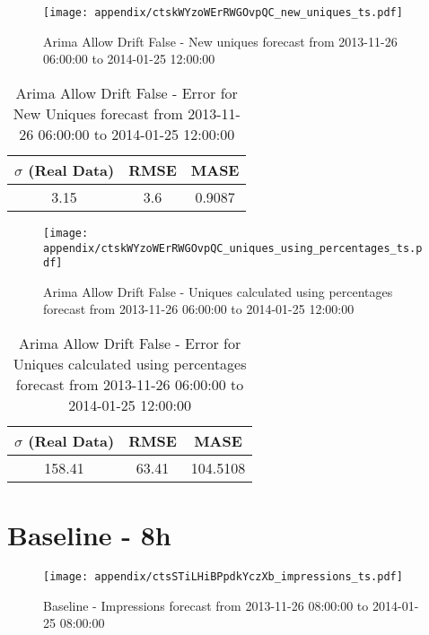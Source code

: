 \begin{figure}[H] \begin{center} \leavevmode
\texttt{[image: appendix/ctskWYzoWErRWGOvpQC\_new\_uniques\_ts.pdf]} \caption{
Arima Allow Drift False - New uniques forecast from 2013-11-26 06:00:00 to 2014-01-25 12:00:00} \label{fig:appendix/ctskWYzoWErRWGOvpQC_new_uniques_ts.pdf} \end{center}
\end{figure}

\begin{table}[H]
\centering
\footnotesize
\begin{tabular}{ccc}
$\sigma$ (Real Data) & RMSE & MASE   \\ \hline
3.15 & 3.6 & 0.9087 \\
\end{tabular}

\vspace{0.5cm}

\caption{
Arima Allow Drift False - Error for New Uniques forecast from 2013-11-26 06:00:00 to 2014-01-25 12:00:00}
\end{table}

\begin{figure}[H] \begin{center} \leavevmode
\texttt{[image: appendix/ctskWYzoWErRWGOvpQC\_uniques\_using\_percentages\_ts.pdf]} \caption{
Arima Allow Drift False - Uniques calculated using percentages forecast from 2013-11-26 06:00:00 to 2014-01-25 12:00:00} \label{fig:appendix/ctskWYzoWErRWGOvpQC_uniques_using_percentages_ts.pdf} \end{center}
\end{figure}

\begin{table}[H]
\centering
\footnotesize
\begin{tabular}{ccc}
$\sigma$ (Real Data) & RMSE & MASE   \\ \hline
158.41 & 63.41 & 104.5108 \\
\end{tabular}

\vspace{0.5cm}

\caption{
Arima Allow Drift False - Error for Uniques calculated using percentages forecast from 2013-11-26 06:00:00 to 2014-01-25 12:00:00}
\end{table}

\section{Baseline - 8h}
\begin{figure}[H] \begin{center} \leavevmode
\texttt{[image: appendix/ctsSTiLHiBPpdkYczXb\_impressions\_ts.pdf]} \caption{
Baseline - Impressions forecast from 2013-11-26 08:00:00 to 2014-01-25 08:00:00} \label{fig:appendix/ctsSTiLHiBPpdkYczXb_impressions_ts.pdf} \end{center}
\end{figure}

